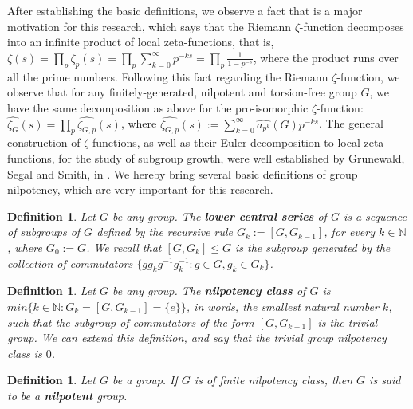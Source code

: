 \documentclass[12pt]{article}
\newtheorem{definition}[theorem]{Definition}
\begin{document}
After establishing the basic definitions, we observe a fact that is a major motivation for this research, which says that the Riemann $\zeta$-function decomposes into an infinite product of local zeta-functions, that is, $\zeta(s)=\prod_p\zeta_p(s)=\prod_p\sum_{k=0}^\infty p^{-ks}=\prod_p\frac{1}{1-p^{-s}}$, where the product runs over all the prime numbers. Following this fact regarding the Riemann $\zeta$-function, we observe that for any finitely-generated, nilpotent and torsion-free group $G$, we have the same decomposition as above for the pro-isomorphic $\zeta$-function: $\hat{\zeta_G}(s)=\prod_p\hat{\zeta_{G,p}}(s)$, where $\hat{\zeta_{G,p}}(s):=\sum_{k=0}^\infty \hat{a_{p^k}}(G)p^{-ks}$. The general construction of $\zeta$-functions, as well as their Euler decomposition to local zeta-functions, for the study of subgroup growth, were well established by Grunewald, Segal and Smith, in \cite{GrunewaldSegalSmith}. We hereby bring several basic definitions of group nilpotency, which are very important for this research.
\begin{definition}
\label{def.lower.central.series}
Let $G$ be any group. The \textbf{lower central series} of $G$ is a sequence of subgroups of $G$ defined by the recursive rule $G_k:=[G,G_{k-1}]$, for every $k\in\mathbb{N}$, where $G_0:=G$.  We recall that $[G,G_k]\leq G$ is the subgroup generated by the collection of commutators $\{gg_kg^{-1}g_k^{-1} : g\in G,g_k\in G_k\}$.
\end{definition}
\begin{definition}
\label{def.nilpotency.class}
Let $G$ be any group. The \textbf{nilpotency class} of $G$ is $min\{k\in\mathbb{N} : G_k=[G,G_{k-1}]=\{e\}\}$, in words, the smallest natural number $k$, such that the subgroup of commutators of the form $[G,G_{k-1}]$ is the trivial group. We can extend this definition, and say that the trivial group nilpotency class is $0$.
\end{definition}
\begin{definition}
\label{def.nilpotent.group}
Let $G$ be a group. If $G$ is of finite nilpotency class, then $G$ is said to be a \textbf{nilpotent} group.
\end{definition}
\end{document}
